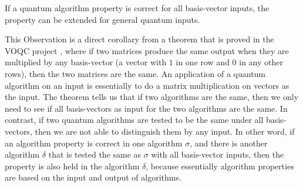 \begin{observation}
\label{basic-state-thm}
\rm
If a quantum algorithm property is correct for all basis-vector inputs, the property can be extended for general quantum inputs.
\end{observation}

This Observation is a direct corollary from a theorem that is proved in the VOQC project \cite{10.1145/3434318}, where if two matrices produce the same output when they are multiplied by any basis-vector (a vector with $1$ in one row and $0$ in any other rows), then the two matrices are the same. An application of a quantum algorithm on an input is essentially to do a matrix multiplication on vectors as the input. The theorem tells us that if two algorithms are the same, then we only need to see if all basis-vectors as input for the two algorithms are the same. In contrast, if two quantum algorithms are tested to be the same under all basis-vectors, then we are not able to distinguish them by any input. In other word, if an algorithm property is correct in one algorithm $\sigma$, and there is another algorithm $\delta$ that is tested the same as $\sigma$ with all basis-vector inputs, then the property is also held in the algorithm $\delta$, because essentially algorithm properties are based on the input and output of algorithms. 

